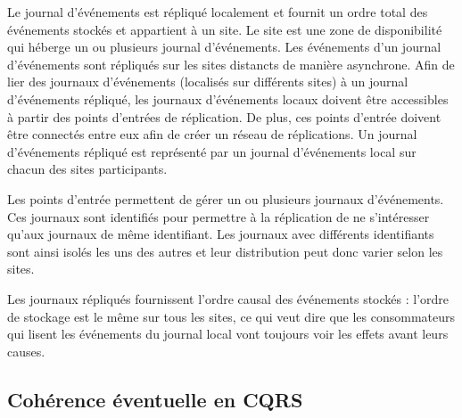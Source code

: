 Le journal d'événements est répliqué localement et fournit un ordre total des 
événements stockés et appartient à un site. 
Le site est une zone de disponibilité qui héberge un ou plusieurs 
journal d'événements. Les événements d'un journal d'événements sont 
répliqués sur les sites distancts de manière asynchrone. 
Afin de lier des journaux d'événements (localisés sur différents sites) à un journal 
d'événements répliqué, les 
journaux d'événements locaux doivent être accessibles à partir des points 
d'entrées de réplication. De plus, ces points d'entrée doivent être 
connectés entre eux afin de créer un réseau de réplications. 
Un journal d'événements répliqué est représenté par un journal d'événements local 
sur chacun des sites participants.


Les points d'entrée permettent de gérer un ou plusieurs journaux d'événements. 
Ces journaux sont identifiés pour permettre à la réplication de ne s'intéresser 
qu'aux journaux de même identifiant. 
Les journaux avec différents identifiants sont ainsi isolés les uns des autres et 
leur distribution peut donc varier selon les sites.

Les journaux répliqués fournissent l'ordre causal des événements stockés : l'ordre 
de stockage est le même sur tous les sites, ce qui veut dire que les 
consommateurs qui lisent les événements du journal local vont toujours voir les 
effets avant leurs causes.



\subsection{Cohérence éventuelle en CQRS}


